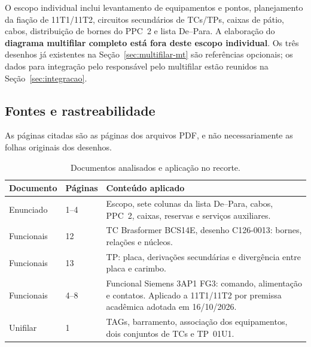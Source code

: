 \documentclass[11pt,a4paper]{article}
\begin{document}
O escopo individual inclui levantamento de equipamentos e pontos, planejamento
da fiação de 11T1/11T2, circuitos secundários de TCs/TPs, caixas de pátio,
cabos, distribuição de bornes do PPC~2 e lista De--Para. A elaboração do
\textbf{diagrama multifilar completo está fora deste escopo individual}.
Os três desenhos já existentes na Seção~\ref{sec:multifilar-mt} são referências
opcionais; os dados para integração pelo responsável pelo multifilar estão
reunidos na Seção~\ref{sec:integracao}.

\subsection{Fontes e rastreabilidade}
As páginas citadas são as páginas dos arquivos PDF, e não necessariamente as folhas
originais dos desenhos.
\begin{table}[htbp]\centering\small
\caption{Documentos analisados e aplicação no recorte.}
\begin{tabularx}{\linewidth}{@{}L{3.1cm}L{2.1cm}Y@{}}\toprule
Documento & Páginas & Conteúdo aplicado \\\midrule
Enunciado~\cite{enunciado} & 1--4 & Escopo, sete colunas da lista De--Para, cabos, PPC~2, caixas, reservas e serviços auxiliares.\\
Funcionais~\cite{funcionais} & 12 & TC Brasformer BCS14E, desenho C126-0013: bornes, relações e núcleos.\\
Funcionais~\cite{funcionais} & 13 & TP: placa, derivações secundárias e divergência entre placa e carimbo.\\
Funcionais~\cite{funcionais} & 4--8 & Funcional Siemens 3AP1 FG3: comando, alimentação e contatos. Aplicado a 11T1/11T2 por premissa acadêmica adotada em 16/10/2026.\\
Unifilar~\cite{unifilar} & 1 & TAGs, barramento, associação dos equipamentos, dois conjuntos de TCs e TP~01U1.\\\bottomrule
\end{tabularx}\end{table}
\end{document}
